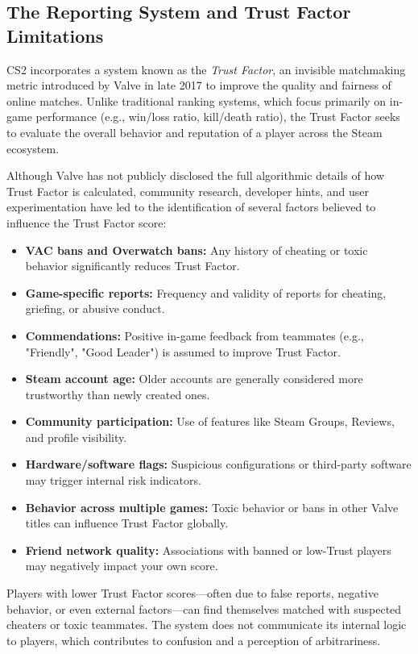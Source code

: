 \subsection{The Reporting System and Trust Factor Limitations}

CS2 incorporates a system known as the \textit{Trust Factor}, an invisible matchmaking metric introduced by Valve in late 2017 to improve the quality and fairness of online matches. Unlike traditional ranking systems, which focus primarily on in-game performance (e.g., win/loss ratio, kill/death ratio), the Trust Factor seeks to evaluate the overall behavior and reputation of a player across the Steam ecosystem.

Although Valve has not publicly disclosed the full algorithmic details of how Trust Factor is calculated, community research, developer hints, and user experimentation have led to the identification of several factors believed to influence the Trust Factor score:

\begin{itemize}
  \item \textbf{VAC bans and Overwatch bans:} Any history of cheating or toxic behavior significantly reduces Trust Factor.
  \item \textbf{Game-specific reports:} Frequency and validity of reports for cheating, griefing, or abusive conduct.
  \item \textbf{Commendations:} Positive in-game feedback from teammates (e.g., "Friendly", "Good Leader") is assumed to improve Trust Factor.
  \item \textbf{Steam account age:} Older accounts are generally considered more trustworthy than newly created ones.
  \item \textbf{Community participation:} Use of features like Steam Groups, Reviews, and profile visibility.
  \item \textbf{Hardware/software flags:} Suspicious configurations or third-party software may trigger internal risk indicators.
  \item \textbf{Behavior across multiple games:} Toxic behavior or bans in other Valve titles can influence Trust Factor globally.
  \item \textbf{Friend network quality:} Associations with banned or low-Trust players may negatively impact your own score.
\end{itemize}

Players with lower Trust Factor scores—often due to false reports, negative behavior, or even external factors—can find themselves matched with suspected cheaters or toxic teammates. The system does not communicate its internal logic to players, which contributes to confusion and a perception of arbitrariness.

